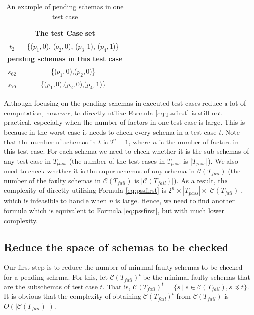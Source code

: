 \begin{table}[htbp]
  \centering
  \caption{An example of pending schemas in one test case}
  \label{ex:pendingschemasinonetestcase}
    \begin{tabular}{|c|c|} \hline
     \multicolumn{2}{|c|}{\textbf{The test Case set}} \\ \hline
   $t_{2}$ & \{($p_{1}, 0$), ($p_{2}, 0$), ($p_{3}, 1$), ($p_{4}, 1$)\}\\ \hline
        \multicolumn{2}{|c|}{\textbf{pending schemas in this test case}} \\ \hline
   $s_{62}$ & \{($p_{1}, 0$),($p_{2}, 0$)\} \\
   $s_{ 70}$ & \{($p_{1}, 0$),($p_{2}, 0$),($p_{4}, 1$)\} \\ \hline
    \end{tabular}%
\end{table}


Although focusing on the pending schemas in executed test cases reduce a lot of computation, however, to directly utilize Formula \ref{eq:pssfirst} is still not practical, especially when the number of factors in one test case is large. This is because in the worst case it needs to check every schema in a test case $t$. Note that the number of schemas in $t$ is $2^{n} - 1$, where $n$ is the number of factors in this test case. For each schema we need to check whether it is the sub-schemas of any test case in $T_{pass}$ (the number of the test cases in $T_{pass}$ is |$T_{pass}$|). We also need to check whether it is the super-schemas of any schema in $\mathcal{C}(T_{fail})$ (the number of the faulty schemas in $\mathcal{C}(T_{fail})$ is |$\mathcal{C}(T_{fail})$|). As a result, the complexity of directly utilizing Formula \ref{eq:pssfirst} is $2^{n} \times |T_{pass}| \times |\mathcal{C}(T_{fail})|$, which is infeasible to handle when $n$ is large. Hence, we need to find another formula which is equivalent to Formula \ref{eq:pssfirst}, but with much lower complexity.

\subsection{Reduce the space of schemas to be checked}
Our first step is to reduce the number of minimal faulty schemas to be checked for a pending schema.  For this, let $\mathcal{C}(T_{fail})^{t}$ be the minimal faulty schemas that are the subschemas of test case $t$. That is, $\mathcal{C}(T_{fail})^{t}$ = $\{ s\ | \ s \in \mathcal{C}(T_{fail}), s \preceq t \}$.  It is obvious that the complexity of obtaining $\mathcal{C}(T_{fail})^{t}$ from $\mathcal{C}(T_{fail})$ is $O(|\mathcal{C}(T_{fail})|)$.

